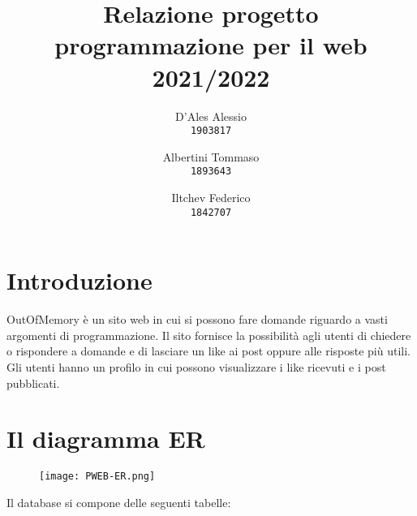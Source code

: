 \documentclass{article} %
\title{Relazione progetto programmazione per il web 2021/2022} %
\author{
  D'Ales Alessio\\
  \texttt{1903817}
  \and
  Albertini Tommaso\\
  \texttt{1893643}
  \and
  Iltchev Federico\\
  \texttt{1842707}
}
\date{} %
\begin{document}
    \maketitle %
    

    \section{Introduzione}

    OutOfMemory è un sito web in cui si possono fare domande riguardo a vasti argomenti di programmazione.
    Il sito fornisce la possibilità agli utenti di chiedere o rispondere a domande e di lasciare un like ai post oppure alle risposte
    più utili. Gli utenti hanno un profilo in cui possono visualizzare i like ricevuti e i post pubblicati.

    \section{Il diagramma ER}


    \begin{figure}[h!]
        \texttt{[image: PWEB-ER.png]}
    \end{figure}

    Il database si compone delle seguenti tabelle:
\end{document}
